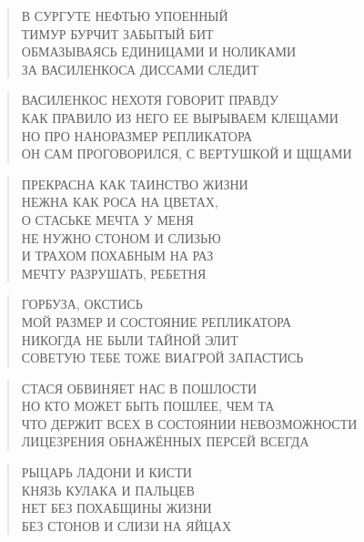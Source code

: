 \poemtitle{***}
\begin{verse}
В СУРГУТЕ НЕФТЬЮ УПОЕННЫЙ\\
ТИМУР БУРЧИТ ЗАБЫТЫЙ БИТ\\
ОБМАЗЫВАЯСЬ ЕДИНИЦАМИ И НОЛИКАМИ\\
ЗА ВАСИЛЕНКОСА ДИССАМИ СЛЕДИТ
\end{verse}

\poemtitle{***}
\begin{verse}
ВАСИЛЕНКОС НЕХОТЯ ГОВОРИТ ПРАВДУ\\
КАК ПРАВИЛО ИЗ НЕГО ЕЕ ВЫРЫВАЕМ КЛЕЩАМИ\\
НО ПРО НАНОРАЗМЕР РЕПЛИКАТОРА\\
ОН САМ ПРОГОВОРИЛСЯ, С ВЕРТУШКОЙ И ЩЩАМИ
\end{verse}

\poemtitle{***}
\begin{verse}
ПРЕКРАСНА КАК ТАИНСТВО ЖИЗНИ\\
НЕЖНА КАК РОСА НА ЦВЕТАХ,\\
          О СТАСЬКЕ МЕЧТА У МЕНЯ\\
НЕ НУЖНО СТОНОМ И СЛИЗЬЮ\\
И ТРАХОМ ПОХАБНЫМ НА РАЗ\\
          МЕЧТУ РАЗРУШАТЬ, РЕБЕТНЯ
\end{verse}

\poemtitle{***}
\begin{verse}
ГОРБУЗА, ОКСТИСЬ\\
МОЙ РАЗМЕР И СОСТОЯНИЕ РЕПЛИКАТОРА\\
НИКОГДА НЕ БЫЛИ ТАЙНОЙ ЭЛИТ\\
СОВЕТУЮ ТЕБЕ ТОЖЕ ВИАГРОЙ ЗАПАСТИСЬ
\end{verse}

\poemtitle{***}
\begin{verse}
СТАСЯ ОБВИНЯЕТ НАС В ПОШЛОСТИ\\
НО КТО МОЖЕТ БЫТЬ ПОШЛЕЕ, ЧЕМ ТА\\
ЧТО ДЕРЖИТ ВСЕХ В СОСТОЯНИИ НЕВОЗМОЖНОСТИ\\
ЛИЦЕЗРЕНИЯ ОБНАЖЁННЫХ ПЕРСЕЙ ВСЕГДА
\end{verse}

\poemtitle{***}
\begin{verse}
РЫЦАРЬ ЛАДОНИ И КИСТИ\\
КНЯЗЬ КУЛАКА И ПАЛЬЦЕВ\\
НЕТ БЕЗ ПОХАБЩИНЫ ЖИЗНИ\\
БЕЗ СТОНОВ И СЛИЗИ НА ЯЙЦАХ
\end{verse}


